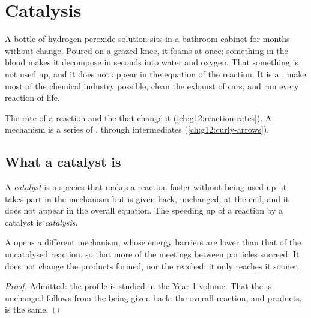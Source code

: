 \chapter{Catalysis}\label{ch:g12:catalysis}

A bottle of hydrogen peroxide solution sits in a bathroom cabinet for
months without change. Poured on a grazed knee, it foams at once:
something in the blood makes it decompose in seconds into water and
oxygen. That something is not used up, and it does not appear in the
equation of the reaction. It is a .  make most of the
chemical industry possible, clean the exhaust of cars, and run every
reaction of life.

\begin{recall}
The rate of a reaction and the  that change it
(\cref{ch:g12:reaction-rates}). A mechanism is a series of , through intermediates (\cref{ch:g12:curly-arrows}).
\end{recall}

\section{What a catalyst is}

\begin{definition}\label{def:g12:catalysis:catalyst}
A \emph{catalyst} is a species that makes a reaction
faster without being used up: it takes part in the mechanism but is given
back, unchanged, at the end, and it does not appear in the overall
equation. The speeding up of a reaction by a catalyst is
\emph{catalysis}.
\end{definition}

\begin{proposition}\label{prop:g12:catalysis:path}
A  opens a different mechanism, whose energy barriers are lower
than that of the uncatalysed reaction, so that more of the meetings
between particles succeed. It does not change the products formed, nor
the  reached; it only reaches it sooner.
\end{proposition}

\begin{proof}
Admitted: the profile is studied in the Year 1 volume. That the  is unchanged follows from the  being given back: the
overall reaction,  and products, is the same.
\end{proof}

